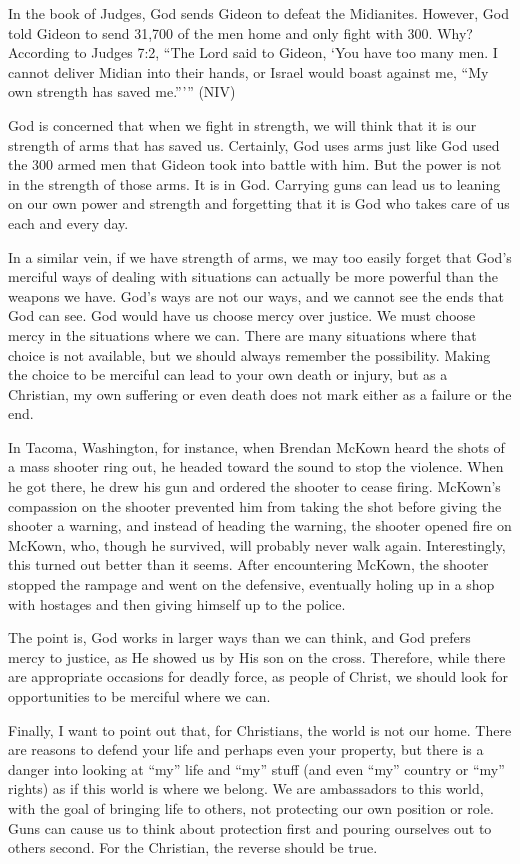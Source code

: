 In the book of Judges, God sends Gideon to defeat the Midianites.
However, God told Gideon to send 31,700 of the men home and only fight
with 300. Why?  According to Judges 7:2, “The Lord said to Gideon, ‘You
have too many men. I cannot deliver Midian into their hands, or Israel
would boast against me, “My own strength has saved me.”’” (NIV)

God is concerned that when we fight in strength, we will think that it
is our strength of arms that has saved us. Certainly, God uses arms
just like God used the 300 armed men that Gideon took into battle with
him. But the power is not in the strength of those arms. It is in God.
Carrying guns can lead us to leaning on our own power and strength and
forgetting that it is God who takes care of us each and every day.

In a similar vein, if we have strength of arms, we may too easily forget
that God’s merciful ways of dealing with situations can actually be
more powerful than the weapons we have. God’s ways are not our ways,
and we cannot see the ends that God can see. God would have us choose
mercy over justice. We must choose mercy in the situations where we
can. There are many situations where that choice is not available, but
we should always remember the possibility. Making the choice to be
merciful can lead to your own death or injury, but as a Christian, my
own suffering or even death does not mark either as a failure or the
end. 

In Tacoma, Washington, for instance, when Brendan McKown heard the shots
of a mass shooter ring out, he headed toward the sound to stop the
violence.  When he got there, he drew his gun and ordered the shooter
to cease firing. McKown’s compassion on the shooter prevented him from
taking the shot before giving the shooter a warning, and instead of
heading the warning, the shooter opened fire on McKown, who, though he
survived, will probably never walk again. Interestingly, this turned
out better than it seems. After encountering McKown, the shooter
stopped the rampage and went on the defensive, eventually holing up in
a shop with hostages and then giving himself up to the police.  

The point is, God works in larger ways than we can think, and God
prefers mercy to justice, as He showed us by His son on the cross.
Therefore, while there are appropriate occasions for deadly force, as
people of Christ, we should look for opportunities to be merciful where
we can.

Finally, I want to point out that, for Christians, the world is not our
home. There are reasons to defend your life and perhaps even your
property, but there is a danger into looking at “my” life and “my”
stuff (and even “my” country or “my” rights) as if this world is where
we belong. We are ambassadors to this world, with the goal of bringing
life to others, not protecting our own position or role. Guns can cause
us to think about protection first and pouring ourselves out to others
second. For the Christian, the reverse should be true.

